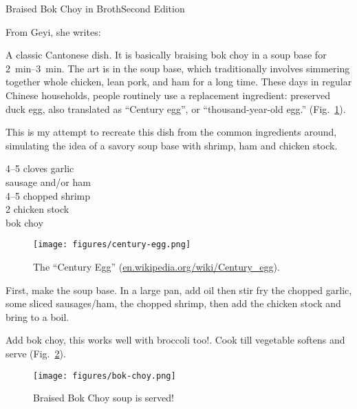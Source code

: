 \begin{entry}{Braised Bok Choy in Broth}{Second Edition}

\begin{open}
    From Geyi, she writes:

    A classic Cantonese dish. It is basically braising bok choy in a soup base
    for \SIrange{2}{3}{\minute}. The art is in the soup base, which
    traditionally involves simmering together whole chicken, lean pork, and ham
    for a long time. These days in regular Chinese households, people routinely
    use a replacement ingredient: preserved duck egg, also translated as
    ``Century egg'', or ``thousand-year-old egg.'' (Fig.~\ref{fig:century-egg}).

    This is my attempt to recreate this dish from the common ingredients around,
    simulating the idea of a savory soup base with shrimp, ham and chicken
    stock.
\end{open}
\begin{ingredients}
    \numrange{4}{5} cloves garlic\\
    sausage and/or ham\\
    \numrange{4}{5} chopped shrimp\\
    \SI{2}{\cup} chicken stock\\
    bok choy
\end{ingredients}
\begin{figure}[b]
    \centering
    \texttt{[image: figures/century-egg.png]}
    \caption{The ``Century Egg'' (\url{en.wikipedia.org/wiki/Century_egg}).}
    \label{fig:century-egg}
\end{figure}
First, make the soup base.  In a large pan, add oil then stir fry the chopped
garlic, some sliced sausages/ham, the chopped shrimp, then add the chicken stock
and bring to a boil.

Add bok choy, this works well with broccoli too!.  Cook till vegetable softens
and serve (Fig.~\ref{fig:bok-choy}).
\begin{figure}
    \centering
    \texttt{[image: figures/bok-choy.png]}
    \caption{Braised Bok Choy soup is served!}
    \label{fig:bok-choy}
\end{figure}
\end{entry}